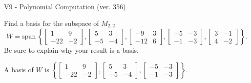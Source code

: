 \begin{exercise}
  \begin{exerciseTitle}V9 - Polynomial Computation (ver. 356)\end{exerciseTitle}
  \begin{exerciseStatement}
    Find a basis for the subspace of \(M_{2,2}\) 
\[W=\mathrm{span}\ \left\{\left[\begin{array}{cc}
1 & 9 \\
-22 & -2
\end{array}\right] , \left[\begin{array}{cc}
5 & 3 \\
-5 & -4
\end{array}\right] , \left[\begin{array}{cc}
-9 & 3 \\
-12 & 6
\end{array}\right] , \left[\begin{array}{cc}
-5 & -3 \\
-1 & -3
\end{array}\right] , \left[\begin{array}{cc}
3 & -1 \\
4 & -2
\end{array}\right]\right\}.\]
 Be sure to explain why your result is a basis.


  \end{exerciseStatement}
  \begin{exerciseAnswer}
   A basis of \(W\) is  \(\left\{\left[\begin{array}{cc}
1 & 9 \\
-22 & -2
\end{array}\right] , \left[\begin{array}{cc}
5 & 3 \\
-5 & -4
\end{array}\right] , \left[\begin{array}{cc}
-5 & -3 \\
-1 & -3
\end{array}\right]\right\}\).
  


  \end{exerciseAnswer}
\end{exercise}